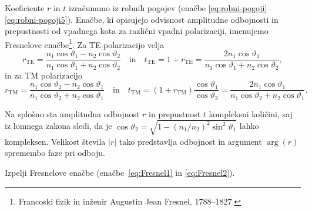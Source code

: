 Koeficiente $r$ in $t$ izračunamo iz robnih pogojev (enačbe 
\ref{eq:robni-pogoji}--\ref{eq:robni-pogoji5}). Enačbe, ki opisujejo odvisnost amplitudne odbojnosti
in prepustnosti od vpadnega kota za različni vpadni polarizaciji, imenujemo
Fresnelove enačbe\footnote{Francoski fizik in inženir 
Augustin Jean Fresnel, 1788--1827.}. Za TE polarizacijo velja 
\begin{equation}
r_{\mathrm{TE}}=\frac{n_{1}\cos\vartheta_{1}-n_{2}\cos\vartheta_{2}}{n_{1}\cos\vartheta_{1}+
n_{2}\cos\vartheta_{2}}
\label{eq:Fresnel1} \quad \mathrm{in} \quad
t_{\mathrm{TE}}=1+r_{\mathrm{TE}}=\frac{2n_{1}\cos\vartheta_{1}}{n_{1}\cos\vartheta_{1}+
n_{2}\cos\vartheta_{2}},
\end{equation}
in za  TM polarizacijo 
\begin{equation}
r_{\mathrm{TM}}=\frac{n_{1}\cos\vartheta_{2}-n_{2}\cos\vartheta_{1}}{n_{1}\cos\vartheta_{2}+
n_{2}\cos\vartheta_{1}}
\quad \mathrm{in} \quad 
t_{\mathrm{TM}}=(1+r_{\mathrm{TM}})\frac{\cos\vartheta_{1}}{\cos\vartheta_{2}}=
\frac{2n_{1}\cos\vartheta_{1}}
{n_{1}\cos\vartheta_{2}+n_{2}\cos\vartheta_{1}}.
\label{eq:Fresnel2}
\end{equation}

Na splošno sta amplitudna odbojnost $r$ in prepustnost $t$ kompleksni
količini, saj iz lomnega zakona sledi, da je $\cos\vartheta_{2}=
\sqrt{1-\left(n_{1}/n_{2}\right)^{2}\sin^{2}\vartheta_{1}}$
lahko kompleksen. Velikost števila $\left|r\right|$ tako predstavlja
odbojnost in argument $\arg(r)$ spremembo faze
pri odboju.

\begin{definition}
Izpelji Fresnelove enačbe (enačbe~\ref{eq:Fresnel1} in \ref{eq:Fresnel2}).
\end{definition}


